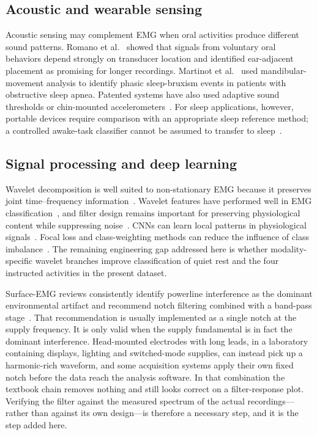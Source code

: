 \documentclass[pdflatex,sn-nature,iicol]{sn-jnl}
\begin{document}
\subsection{Acoustic and wearable sensing}

Acoustic sensing may complement EMG when oral activities produce different sound patterns. Romano et al.~\cite{romano2024wearable} showed that signals from voluntary oral behaviors depend strongly on transducer location and identified ear-adjacent placement as promising for longer recordings. Martinot et al.~\cite{martinot2021artificial} used mandibular-movement analysis to identify phasic sleep-bruxism events in patients with obstructive sleep apnea. Patented systems have also used adaptive sound thresholds or chin-mounted accelerometers~\cite{haugland2020automatic,patwa2017bruxism}. For sleep applications, however, portable devices require comparison with an appropriate sleep reference method; a controlled awake-task classifier cannot be assumed to transfer to sleep~\cite{cidverdejo2024instrumental}.

\subsection{Signal processing and deep learning}

Wavelet decomposition is well suited to non-stationary EMG because it preserves joint time--frequency information~\cite{englehart2003robust}. Wavelet features have performed well in EMG classification~\cite{phinyomark2012feature}, and filter design remains important for preserving physiological content while suppressing noise~\cite{chowdhury2013surface}. CNNs can learn local patterns in physiological signals~\cite{faust2018deep,tsinganos2019improved}. Focal loss and class-weighting methods can reduce the influence of class imbalance~\cite{lin2017focal,johnson2019survey}. The remaining engineering gap addressed here is whether modality-specific wavelet branches improve classification of quiet rest and the four instructed activities in the present dataset.

Surface-EMG reviews consistently identify powerline interference as the dominant environmental artifact and recommend notch filtering combined with a band-pass stage~\cite{chowdhury2013surface,raez2006techniques}. That recommendation is usually implemented as a single notch at the supply frequency. It is only valid when the supply fundamental is in fact the dominant interference. Head-mounted electrodes with long leads, in a laboratory containing displays, lighting and switched-mode supplies, can instead pick up a harmonic-rich waveform, and some acquisition systems apply their own fixed notch before the data reach the analysis software. In that combination the textbook chain removes nothing and still looks correct on a filter-response plot. Verifying the filter against the measured spectrum of the actual recordings---rather than against its own design---is therefore a necessary step, and it is the step added here.
\end{document}
